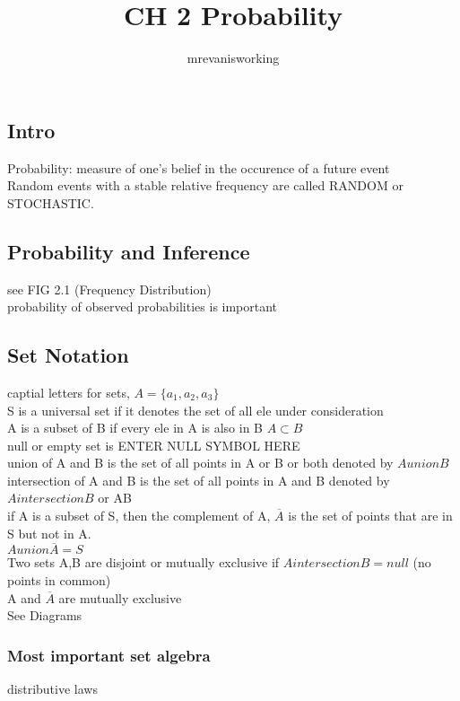 \documentclass[12pt]{article}
\begin{document}
\title{CH 2 Probability}
\author{mrevanisworking}
\maketitle

\subsection{Intro}
    Probability: measure of one's belief in the occurence of a future event\\
    Random events with a stable relative frequency are called RANDOM or
    STOCHASTIC.
\subsection{Probability and Inference}
    see FIG 2.1 (Frequency Distribution)\\
    probability of observed probabilities is important
\subsection{Set Notation}
    captial letters for sets, $ A = \{a_{1}, a_{2}, a_{3}\} $\\
    S is a universal set if it denotes the set of all ele under consideration\\
    A is a subset of B if every ele in A is also in B $ A \subset B $\\
    null or empty set is ENTER NULL SYMBOL HERE\\
    union of A and B is the set of all points in A or B or both
    denoted by $ A union B $ \\
    intersection of A and B is the set of all points in A and B
    denoted by $ A intersection B $ or AB\\
    if A is a subset of S, then the complement of A, $ \overline{A} $ is
    the set of points that are in S but not in A.\\
    $ A union \overline{A} = S $\\
    Two sets A,B are disjoint or mutually exclusive if
    $ A intersection B = null $ (no points in common)\\
    A and $ \overline{A} $ are mutually exclusive \\
    See Diagrams
    \subsubsection{Most important set algebra}
        distributive laws
\end{document}
